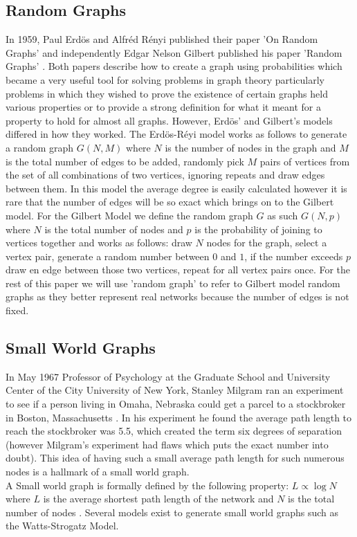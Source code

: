 \documentclass{article}
\begin{document}
        \subsection{Random Graphs}
        In 1959, Paul Erd\"{o}s and Alfr\'{e}d R\'{e}nyi published their paper 'On Random Graphs' \parencite{erd6s1959random} and independently Edgar Nelson Gilbert published his paper 'Random Graphs' \parencite{gilbert1959random}. Both papers describe how to create a graph using probabilities which became a very useful tool for solving problems in graph theory particularly problems in which they wished to prove the existence of certain graphs held various properties or to provide a strong definition for what it meant for a property to hold for almost all graphs. However, Erd\"{o}s' and Gilbert's models differed in how they worked. The Erd\"{o}s-R\'{e}yi model works as follows to generate a random graph $G(N,M)$ where $N$ is the number of nodes in the graph and $M$ is the total number of edges to be added, randomly pick $M$ pairs of vertices from the set of all combinations of two vertices, ignoring repeats and draw edges between them. In this model the average degree is easily calculated however it is rare that the number of edges will be so exact which brings on to the Gilbert model. For the Gilbert Model we define the random graph $G$ as such $G(N,p)$ where $N$ is the total number of nodes and $p$ is the probability of joining to vertices together and works as follows: draw $N$ nodes for the graph, select a vertex pair, generate a random number between $0$ and $1$, if the number exceeds $p$ draw en edge between those two vertices, repeat for all vertex pairs once. For the rest of this paper we will use 'random graph' to refer to Gilbert model random graphs as they better represent real networks because the number of edges is not fixed. 
        \subsection{Small World Graphs}
        In May 1967 Professor of Psychology at the Graduate School and University Center of the City University of New York, Stanley Milgram ran an experiment to see if a person living
        in Omaha, Nebraska could get a parcel to a stockbroker in Boston, Massachusetts \parencite{milgram1967small}. In his experiment he found the average path length to reach the stockbroker was 5.5, which created the term
        six degrees of separation (however Milgram's experiment had flaws which puts the exact number into doubt). This idea of having such a small average path length for such numerous nodes is a hallmark of a small world graph.\\
        A Small world graph is formally defined by the following property: $L\propto\log{N}$ where $L$ is the average shortest path length of the network and $N$ is the total number of nodes \parencite{Watts1998}. Several models exist to generate small world graphs such as the Watts-Strogatz Model.
\end{document}

